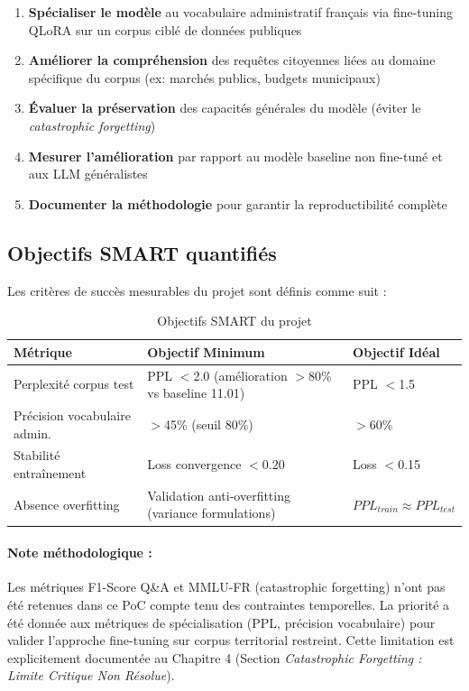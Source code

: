 \begin{enumerate}
    \item \textbf{Spécialiser le modèle} au vocabulaire administratif français via fine-tuning QLoRA sur un corpus ciblé de données publiques
    
    \item \textbf{Améliorer la compréhension} des requêtes citoyennes liées au domaine spécifique du corpus (ex: marchés publics, budgets municipaux)
    
    \item \textbf{Évaluer la préservation} des capacités générales du modèle (éviter le \textit{catastrophic forgetting})
    
    \item \textbf{Mesurer l'amélioration} par rapport au modèle baseline non fine-tuné et aux LLM généralistes
    
    \item \textbf{Documenter la méthodologie} pour garantir la reproductibilité complète
\end{enumerate}

\subsection{Objectifs SMART quantifiés}

Les critères de succès mesurables du projet sont définis comme suit :

\begin{table}[h]
\centering
\small
\caption{Objectifs SMART du projet}
\label{tab:objectifs_smart}
\begin{tabular}{@{}p{4.2cm}p{5cm}p{3.5cm}@{}}
\toprule
\textbf{Métrique} & \textbf{Objectif Minimum} & \textbf{Objectif Idéal} \\ \midrule
Perplexité corpus test & PPL $<$2.0 (amélioration $>$80\% vs baseline 11.01) & PPL $<$1.5 \\
Précision vocabulaire admin. & $>$45\% (seuil 80\%) & $>$60\% \\
Stabilité entraînement & Loss convergence $<$0.20 & Loss $<$0.15 \\
Absence overfitting & Validation anti-overfitting (variance formulations) & $PPL_{train} \approx PPL_{test}$ \\ \bottomrule
\end{tabular}
\end{table}

\paragraph{Note méthodologique :} Les métriques F1-Score Q\&A et MMLU-FR (catastrophic forgetting) n'ont pas été retenues dans ce PoC compte tenu des contraintes temporelles. La priorité a été donnée aux métriques de spécialisation (PPL, précision vocabulaire) pour valider l'approche fine-tuning sur corpus territorial restreint. Cette limitation est explicitement documentée au Chapitre 4 (Section \textit{Catastrophic Forgetting : Limite Critique Non Résolue}).

